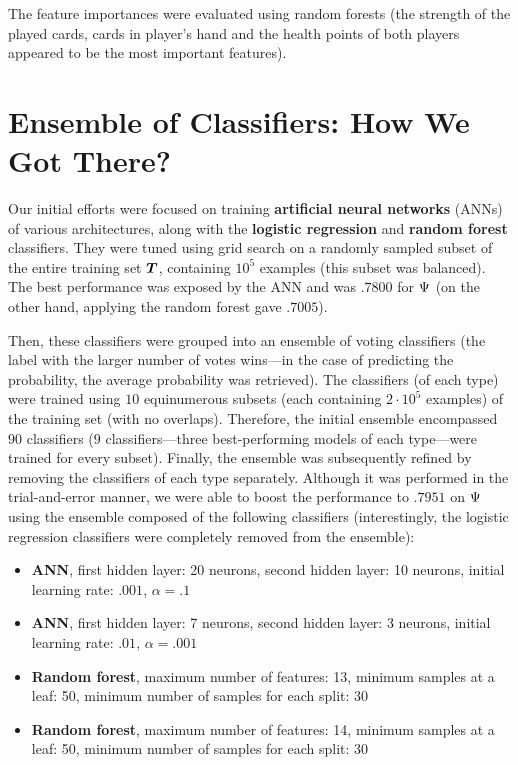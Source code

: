 \documentclass{svproc}
\begin{document}
The feature importances were evaluated using random forests (the strength of the played cards, cards in player's hand and the health points of both players appeared to be the most important features).

\section{Ensemble of Classifiers: How We Got There?}

Our initial efforts were focused on training \textbf{artificial neural networks} (ANNs) of various architectures, along with the \textbf{logistic regression} and \textbf{random forest} classifiers. They were tuned using grid search on a randomly sampled subset of the entire training set $\bm{T}$, containing $10^5$ examples (this subset was balanced). The best performance was exposed by the ANN and was $.7800$ for $\Psi$ (on the other hand, applying the random forest gave $.7005$).

Then, these classifiers were grouped into an ensemble of voting classifiers (the label with the larger number of votes wins---in the case of predicting the probability, the average probability was retrieved). The classifiers (of each type) were trained using $10$ equinumerous subsets (each containing $2\cdot 10^5$ examples) of the training set (with no overlaps). Therefore, the initial ensemble encompassed $90$ classifiers ($9$ classifiers---three best-performing models of each type---were trained for every subset). Finally, the ensemble was subsequently refined by removing the classifiers of each type separately. Although it was performed in the trial-and-error manner, we were able to boost the performance to $.7951$ on $\Psi$ using the ensemble composed of the following classifiers (interestingly, the logistic regression classifiers were completely removed from the ensemble):
\begin{itemize}
  \item \textbf{ANN}, first hidden layer: 20 neurons, second hidden layer: 10 neurons, initial learning rate: $.001$, $\alpha=.1$
  \item \textbf{ANN}, first hidden layer: 7 neurons, second hidden layer: 3 neurons, initial learning rate: $.01$, $\alpha=.001$
  \item \textbf{Random forest}, maximum number of features: 13, minimum samples at a leaf: 50, minimum number of samples for each split: 30
  \item \textbf{Random forest}, maximum number of features: 14, minimum samples at a leaf: 50, minimum number of samples for each split: 30
\end{itemize}
\end{document}
